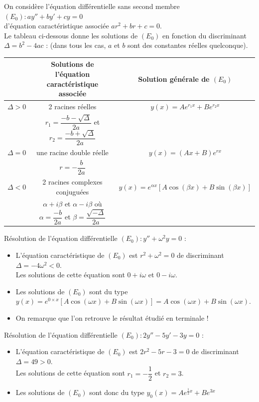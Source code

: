 \documentclass[french]{book}
\begin{document}
\begin{thm}
On considère l'équation différentielle sans second membre $(E_0):ay''+by'+cy= 0$ \\
d'équation caractéristique associée $ar^2+br+c= 0$. \\
Le tableau ci-dessous donne les solutions de $(E_0)$ en fonction du discriminant $\Delta =b^2-4ac$ : (dans tous les cas, $a$ et $b$ sont des constantes réelles quelconque).
\begin{center}
\begin{tabular}{c|c|c}
   & Solutions de l'équation caractéristique associée & Solution générale de $(E_0)$ \\
   \hline
   $\Delta> 0$ & 2 racines réelles & $y(x)= Ae^{r_1x}+Be^{r_2x}$ \\
   & $r_1 =\dfrac{-b-\sqrt{\Delta}}{2a}$ et $r_2 =\dfrac{-b+\sqrt{\Delta}}{2a}$ & \\
   \hline
   $\Delta= 0$ & une racine double réelle & $y(x)=(Ax+B)e^{rx}$ \\
   & $r =-\dfrac{b}{2a}$ & \\
   \hline
   $\Delta< 0$ & 2 racines complexes conjuguées & $y(x)= e^{\alpha x}[A\cos(\beta x)+B\sin(\beta x)]$ \\
   & $\alpha+i\beta$ et $\alpha-i\beta$ où $\alpha =\dfrac{-b}{2a}$ et $\beta  =\dfrac{\sqrt{-\Delta }}{2a}$ & \\
\end{tabular}
\end{center}
\end{thm}

\begin{exemple}
   Résolution de l'équation différentielle $(E_0):y''+\omega^2y=0$ :
   \begin{itemize}
      \item L'équation caractéristique de $(E_0)$ est $r^2+\omega^2 =0$ de discriminant $\Delta =-4\omega^2 <0$. \\
      \hspace*{0.3cm} Les solutions de cette équation sont $0+i\omega$ et $0-i\omega$.
      \item Les solutions de $(E_0)$ sont du type $y(x)= e^{0\times x}[A\cos(\omega x)+B\sin(\omega x)] = A\cos(\omega x)+B\sin(\omega x)$.
      \item On remarque que l'on retrouve le résultat étudié en terminale !
   \end{itemize}
\end{exemple}

\begin{exemple}
   Résolution de l'équation différentielle $(E_0):2y''-5y'-3y=0$ :
   \begin{itemize}
      \item L'équation caractéristique de $(E_0)$ est $2r^2-5r-3 =0$ de discriminant $\Delta =49 >0$. \\
      \hspace*{0.3cm} Les solutions de cette équation sont $r_1 =-\dfrac12$ et $r_2 =3$.
      \item Les solutions de $(E_0)$ sont donc du type $y_0(x) =Ae^{\frac12x}+Be^{3x}$
   \end{itemize}
\end{exemple}
\end{document}
